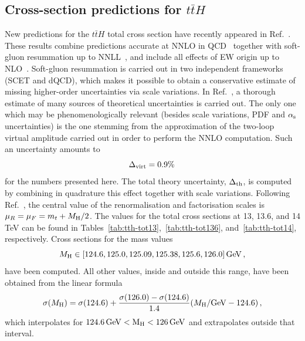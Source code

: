 
\subsection{Cross-section predictions for \texorpdfstring{$t\bar t H$}{ttbar H}}
\label{sec:results-xsects-tth}
New predictions for the $t\bar t H$ total cross section have recently appeared in Ref.~\cite{Balsach:2025jcw}. These results
combine predictions accurate at NNLO in QCD~\cite{Catani:2022mfv,Devoto:2024nhl} together with soft-gluon resummation up to NNLL~\cite{Kulesza:2015vda,Broggio:2015lya,Broggio:2016lfj,
Kulesza:2017ukk,Kulesza:2018tqz,Broggio:2019ewu,Kulesza:2020nfh}, and include all effects of EW origin up to NLO~\cite{Frixione:2014qaa,Frixione:2015zaa,Frederix:2018nkq}.
Soft-gluon resummation is carried out in two independent frameworks (SCET and dQCD), which makes it possible to obtain a conservative estimate of missing higher-order
uncertainties via scale variations. In Ref.~\cite{Balsach:2025jcw}, a thorough estimate of many sources of theoretical uncertainties is carried out.
The only one which may be phenomenologically relevant (besides scale variations, PDF and $\alpha_{\mathrm{s}}$ uncertainties) is the one stemming 
from the approximation of the two-loop virtual amplitude carried out in order to perform the NNLO computation. Such an uncertainty amounts to
\begin{equation}
    \Delta_{\rm virt} = 0.9\%\,
\end{equation}
for the numbers presented here. The total theory uncertainty, $\Delta_{\rm th}$, is computed by combining in quadrature this effect together with scale variations. Following Ref.~\cite{Balsach:2025jcw}, the central value of the renormalisation
and factorisation scales is $\mu_R=\mu_F=m_t+M_\mathrm{H}/2$.
The values for the total cross sections at 13, 13.6, and 14 TeV can be found in Tables~\ref{tab:tth-tot13},~\ref{tab:tth-tot136}, and~\ref{tab:tth-tot14}, respectively. Cross sections
for the mass values
\begin{equation}
    M_\mathrm{H} \in [ 124.6, 125.0, 125.09, 125.38, 125.6, 126.0] \,\rm GeV\,,
\end{equation}
have been computed. All other values, inside and outside this range, have been obtained
from the linear formula
\begin{equation}
    \sigma(M_\mathrm{H})=\sigma(124.6) +\frac{\sigma(126.0)-\sigma(124.6)}{1.4}(M_\mathrm{H}/\rm GeV-124.6)\,,
    \label{eq:inttth}
\end{equation}
which interpolates for $124.6 \,\rm GeV< M_\mathrm{H} < 126\,\rm GeV$ and extrapolates outside that interval.
